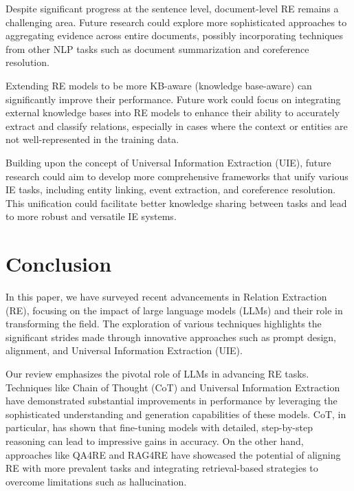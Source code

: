 \documentclass[twocolumn, 11pt]{extarticle}
\begin{document}
Despite significant progress at the sentence level, document-level RE remains a challenging area. Future research could explore more sophisticated approaches to aggregating evidence across entire documents, possibly incorporating techniques from other NLP tasks such as document summarization and coreference resolution.

Extending RE models to be more KB-aware (knowledge base-aware) can significantly improve their performance. Future work could focus on integrating external knowledge bases into RE models to enhance their ability to accurately extract and classify relations, especially in cases where the context or entities are not well-represented in the training data.

Building upon the concept of Universal Information Extraction (UIE), future research could aim to develop more comprehensive frameworks that unify various IE tasks, including entity linking, event extraction, and coreference resolution. This unification could facilitate better knowledge sharing between tasks and lead to more robust and versatile IE systems.

 
\section{Conclusion}
In this paper, we have surveyed recent advancements in Relation Extraction (RE), focusing on the impact of large language models (LLMs) and their role in transforming the field. The exploration of various techniques highlights the significant strides made through innovative approaches such as prompt design, alignment, and Universal Information Extraction (UIE). 

Our review emphasizes the pivotal role of LLMs in advancing RE tasks. Techniques like Chain of Thought (CoT) and Universal Information Extraction have demonstrated substantial improvements in performance by leveraging the sophisticated understanding and generation capabilities of these models. CoT, in particular, has shown that fine-tuning models with detailed, step-by-step reasoning can lead to impressive gains in accuracy. On the other hand, approaches like QA4RE and RAG4RE have showcased the potential of aligning RE with more prevalent tasks and integrating retrieval-based strategies to overcome limitations such as hallucination. 
\end{document}
